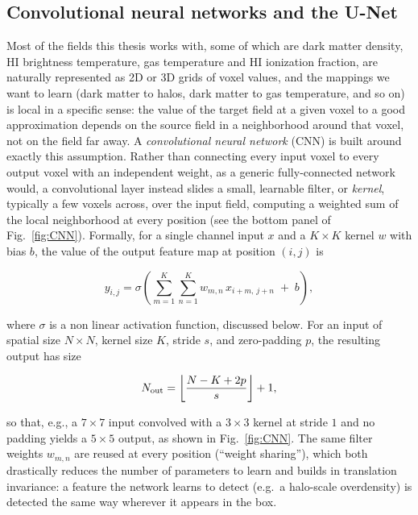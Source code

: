 \subsection{Convolutional neural networks and the U-Net}
\label{sec:cnn_unet}

Most of the fields this thesis works with, some of which are dark matter density, HI
brightness temperature, gas temperature and HI ionization fraction, are naturally represented as 2D or
3D grids of voxel values, and the mappings we want to learn (dark matter to
halos, dark matter to gas temperature, and so on) is local in a specific
sense: the value of the target field at a given voxel to a good approximation depends on the
source field in a neighborhood around that voxel, not on the field far
away. A \emph{convolutional neural network} (CNN) is built around exactly
this assumption. Rather than connecting every input voxel to every output
voxel with an independent weight, as a generic fully-connected network
would, a convolutional layer instead slides a small, learnable filter, or
\emph{kernel}, typically a few voxels across, over the input field,
computing a weighted sum of the local neighborhood at every position (see
the bottom panel of Fig.~\ref{fig:CNN}). Formally, for a single channel
input $x$ and a $K\times K$ kernel $w$ with bias $b$, the value of the
output feature map at position $(i,j)$ is

\begin{equation}
    y_{i,j} = \sigma\!\left(\sum_{m=1}^{K}\sum_{n=1}^{K} w_{m,n}\,
    x_{i+m,\,j+n} \; + \; b\right),
    \label{eq:convolution}
\end{equation}

where $\sigma$ is a non linear activation function, discussed below. For an
input of spatial size $N\times N$, kernel size $K$, stride $s$, and
zero-padding $p$, the resulting output has size

\begin{equation}
    N_{\rm out} = \left\lfloor \frac{N - K + 2p}{s} \right\rfloor + 1 ,
    \label{eq:output_size}
\end{equation}

so that, e.g., a $7\times7$ input convolved with a $3\times3$ kernel at
stride $1$ and no padding yields a $5\times5$ output, as shown in
Fig.~\ref{fig:CNN}. The same filter weights $w_{m,n}$ are reused at every
position (``weight sharing''), which both drastically reduces the number of
parameters to learn and builds in translation invariance: a feature the
network learns to detect (e.g.\ a halo-scale overdensity) is detected the
same way wherever it appears in the box.

